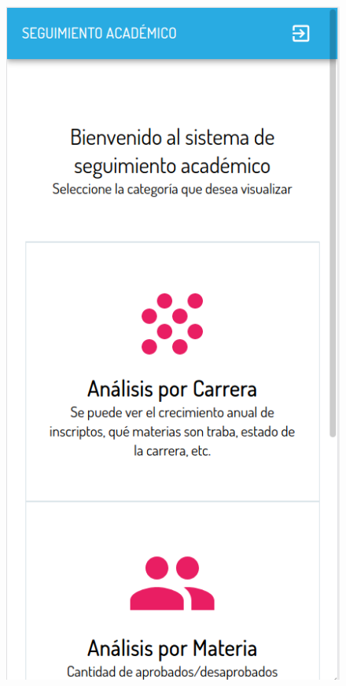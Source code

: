 \begin{figure}[!htbp]
  \centering
    \includegraphics[scale=0.3]{images/seguimiento-academico/sa-mobile-home.png}
  \label{fig:sa-home-mobile}
\end{figure}

